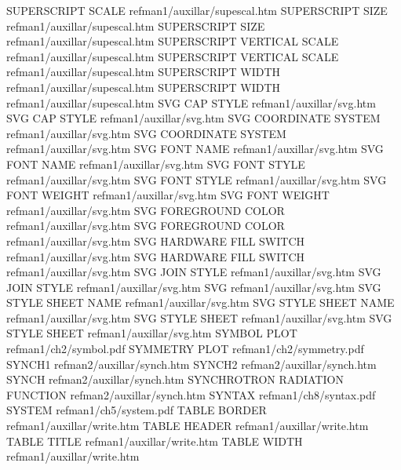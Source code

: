 SUPERSCRIPT SCALE                       refman1/auxillar/supescal.htm
SUPERSCRIPT SIZE                        refman1/auxillar/supescal.htm
SUPERSCRIPT SIZE                        refman1/auxillar/supescal.htm
SUPERSCRIPT VERTICAL SCALE              refman1/auxillar/supescal.htm
SUPERSCRIPT VERTICAL SCALE              refman1/auxillar/supescal.htm
SUPERSCRIPT WIDTH                       refman1/auxillar/supescal.htm
SUPERSCRIPT WIDTH                       refman1/auxillar/supescal.htm
SVG CAP STYLE                           refman1/auxillar/svg.htm
SVG CAP STYLE                           refman1/auxillar/svg.htm
SVG COORDINATE SYSTEM                   refman1/auxillar/svg.htm
SVG COORDINATE SYSTEM                   refman1/auxillar/svg.htm
SVG FONT NAME                           refman1/auxillar/svg.htm
SVG FONT NAME                           refman1/auxillar/svg.htm
SVG FONT STYLE                          refman1/auxillar/svg.htm
SVG FONT STYLE                          refman1/auxillar/svg.htm
SVG FONT WEIGHT                         refman1/auxillar/svg.htm
SVG FONT WEIGHT                         refman1/auxillar/svg.htm
SVG FOREGROUND COLOR                    refman1/auxillar/svg.htm
SVG FOREGROUND COLOR                    refman1/auxillar/svg.htm
SVG HARDWARE FILL SWITCH                refman1/auxillar/svg.htm
SVG HARDWARE FILL SWITCH                refman1/auxillar/svg.htm
SVG JOIN STYLE                          refman1/auxillar/svg.htm
SVG JOIN STYLE                          refman1/auxillar/svg.htm
SVG                                     refman1/auxillar/svg.htm
SVG STYLE SHEET NAME                    refman1/auxillar/svg.htm
SVG STYLE SHEET NAME                    refman1/auxillar/svg.htm
SVG STYLE SHEET                         refman1/auxillar/svg.htm
SVG STYLE SHEET                         refman1/auxillar/svg.htm
SYMBOL PLOT                             refman1/ch2/symbol.pdf
SYMMETRY PLOT                           refman1/ch2/symmetry.pdf
SYNCH1                                  refman2/auxillar/synch.htm
SYNCH2                                  refman2/auxillar/synch.htm
SYNCH                                   refman2/auxillar/synch.htm
SYNCHROTRON RADIATION FUNCTION          refman2/auxillar/synch.htm
SYNTAX                                  refman1/ch8/syntax.pdf
SYSTEM                                  refman1/ch5/system.pdf
TABLE BORDER                            refman1/auxillar/write.htm
TABLE HEADER                            refman1/auxillar/write.htm
TABLE TITLE                             refman1/auxillar/write.htm
TABLE WIDTH                             refman1/auxillar/write.htm
